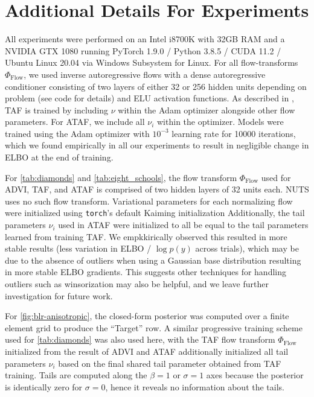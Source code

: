 \documentclass[thesis.tex]{subfiles}
\begin{document}
\section{Additional Details For Experiments}
\label{sec:additional-exp-details}

All experiments were performed on an Intel i8700K with 32GB RAM and a NVIDIA GTX 1080
running PyTorch 1.9.0 / Python 3.8.5 / CUDA 11.2 / Ubuntu Linux 20.04 via Windows Subsystem for Linux.
For all flow-transforms $\Phi_{\text{Flow}}$, we used inverse autoregressive flows \citep{kingma2016improved} with a
dense autoregressive conditioner consisting of two layers of either 32 or 256 hidden units depending on problem (see code for details) and
ELU activation functions.
As described in \citet{jaini2020tails}, TAF is trained by including $\nu$ within the Adam optimizer alongside other flow parameters. For ATAF, we include all $\nu_i$ within the optimizer.
Models were trained using the Adam optimizer with $10^{-3}$ learning rate
for 10000 iterations, which we found empirically in all our experiments to result in negligible change in ELBO
at the end of training.

For \cref{tab:diamonds} and \cref{tab:eight_schools}, the flow transform $\Phi_{\text{Flow}}$ used for ADVI, TAF, and ATAF
is comprised of two hidden layers of 32 units each. NUTS uses no such flow transform. Variational parameters for each normalizing flow were initialized
using \texttt{torch}'s default Kaiming initialization \citep{he2015delving} Additionally, the tail parameters $\nu_i$
used in ATAF were initialized to all be equal to the tail parameters learned from training TAF. We empkkirically observed
this resulted in more stable results (less variation in ELBO / $\log p(y)$ across trials), which may be due to
the absence of outliers when using a Gaussian base distribution resulting in more stable ELBO gradients. This suggests
other techniques for handling outliers such as winsorization may also be helpful, and we leave further investigation
for future work.


For \cref{fig:blr-anisotropic}, the closed-form posterior was computed over a finite element grid to produce
the ``Target'' row. A similar progressive training scheme used for \cref{tab:diamonds} was also used here, with
the TAF flow transform $\Phi_{\text{Flow}}$ initialized from the result of ADVI and ATAF additionally initialized
all tail parameters $\nu_i$ based on the final shared tail parameter obtained from TAF training. Tails are computed
along the $\beta = 1$ or $\sigma = 1$ axes because the posterior is identically zero for $\sigma = 0$, hence it reveals
no information about the tails.
\end{document}
